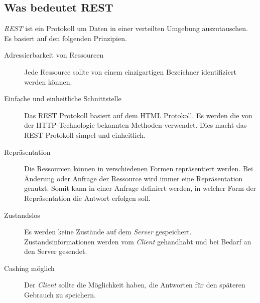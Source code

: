 \documentclass[12pt, paper=a4, bibtotoc, toc=listof, headsepline=true]{scrreprt}
\begin{document}
\subsection{Was bedeutet REST}
\emph{\ac{REST}} ist ein Protokoll um Daten in einer verteilten Umgebung auszutauschen. Es basiert auf den folgenden Prinzipien\cite[S.77]{chauhan2014asp}.
\begin{description}  
	\item  [Adressierbarkeit von Ressourcen]
	Jede Ressource sollte von einem einzigartigen Bezeichner identifiziert werden können.
	
	\item [Einfache und einheitliche Schnittstelle]
	Das \ac{REST} Protokoll basiert auf dem \ac{HTML} Protokoll. Es werden die von der \ac{HTTP}-Technologie bekannten Methoden verwendet. Dies macht das \ac{REST} Protokoll 
	simpel und einheitlich.
	
	\item  [Repräsentation] 
	Die Ressourcen können in verschiedenen Formen repräsentiert werden. Bei Änderung oder Anfrage der Ressource wird immer eine Repräsentation genutzt. Somit kann in einer Anfrage definiert werden, in welcher Form der Repräsentation die Antwort erfolgen soll.
	
	\item [Zustandslos]
	Es werden keine Zustände auf dem \emph{Server} gespeichert. Zustandsinformationen werden vom \emph{Client} gehandhabt und bei Bedarf an den Server gesendet.
	
	\item [Cashing möglich]
	Der \emph{Client} sollte die Möglichkeit haben,  die Antworten für den späteren Gebrauch zu speichern.	
\end{description}
\end{document}
